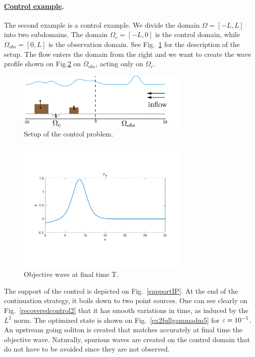 \paragraph{\underline{Control example}.}
The second example is a control example. We divide the domain $\Omega = [-L,L]$ into two subdomains. The domain $\Omega_c = [-L,0]$ is the control domain, while $\Omega_{obs} = [0,L]$ is the observation domain. See Fig.~\ref{controlsetup} for the description of the setup. The flow enters the domain from the right and we want to create the wave profile shown on Fig.\ref{objectivewave} on $\Omega_{obs}$, acting only on $\Omega_c$.
\begin{figure}[!h]
\includegraphics[width = 0.75\textwidth]{images/control_setup.png}
\caption{Setup of the control problem.}
\label{controlsetup}
\end{figure}
\begin{figure}[!h]
\includegraphics[width = 0.75\textwidth]{images/ex2yd.pdf}
\caption{Objective wave at final time T.}
\label{objectivewave}
\end{figure}
The support of the control is depicted on Fig.~\ref{supportIP}. At the end of the continuation strategy, it boils down to two point sources. One can see clearly on Fig.~\ref{recoveredcontrol2} that it has smooth variations in time, as induced by the $L^2$ norm. The optimized state is shown on Fig.~\ref{ex2fullgammadm5} for $\varepsilon = 10^{-5}$. An upstream going soliton is created that matches accurately at final time the objective wave. Naturally, spurious waves are created on the control domain that do not have to be avoided since they are not observed.

